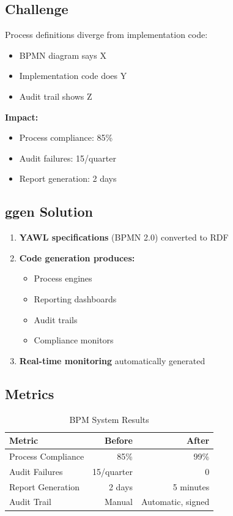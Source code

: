\subsection{Challenge}

Process definitions diverge from implementation code:
\begin{itemize}
    \item BPMN diagram says X
    \item Implementation code does Y
    \item Audit trail shows Z
\end{itemize}

\textbf{Impact:}
\begin{itemize}
    \item Process compliance: 85\%
    \item Audit failures: 15/quarter
    \item Report generation: 2 days
\end{itemize}

\subsection{ggen Solution}

\begin{enumerate}
    \item \textbf{YAWL specifications} (BPMN 2.0) converted to RDF
    \item \textbf{Code generation produces:}
        \begin{itemize}
            \item Process engines
            \item Reporting dashboards
            \item Audit trails
            \item Compliance monitors
        \end{itemize}
    \item \textbf{Real-time monitoring} automatically generated
\end{enumerate}

\subsection{Metrics}

\begin{table}[h]
\centering
\caption{BPM System Results}
\begin{tabular}{lrr}
\toprule
\textbf{Metric} & \textbf{Before} & \textbf{After} \\
\midrule
Process Compliance & 85\% & 99\% \\
Audit Failures & 15/quarter & 0 \\
Report Generation & 2 days & 5 minutes \\
Audit Trail & Manual & Automatic, signed \\
\bottomrule
\end{tabular}
\end{table}

